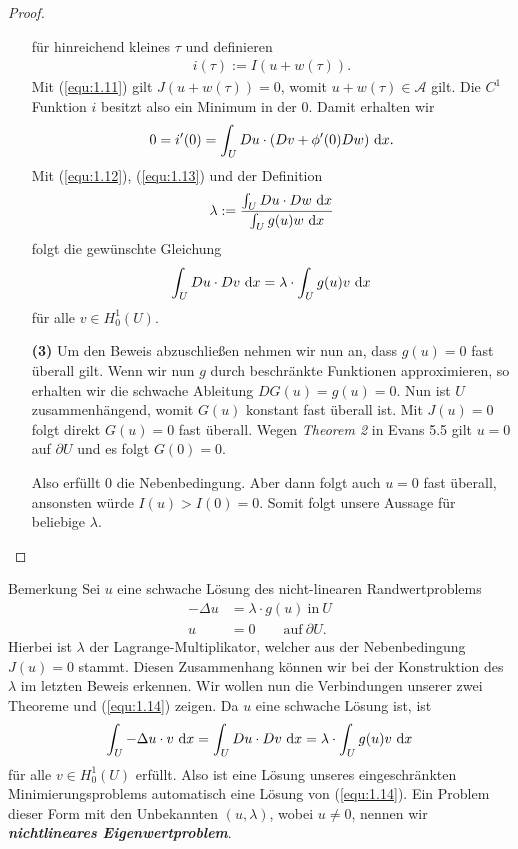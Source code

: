 \begin{proof}
\begin{enumerate}
für hinreichend kleines $\tau$ und definieren
\begin{align*}
i(\tau) := I ( u + w(\tau)).
\end{align*}
Mit (\ref{equ:1.11}) gilt $J(u + w(\tau)) = 0 $, womit $u + w(\tau) \in \mathcal{A}$ gilt.
Die $C^1$ Funktion $i$ besitzt also ein Minimum in der $0$.
Damit erhalten wir
\begin{equation}\label{equ:1.13}
0 = i^\prime(0) = \int_U Du \cdot (Dv + \phi^\prime(0)Dw) \td{x}.
\end{equation}
Mit (\ref{equ:1.12}), (\ref{equ:1.13}) und der Definition
\begin{align*}
\lambda := \frac{\int_U Du \cdot Dw \td{x}}{\int_U g(u)w \td{x}}
\end{align*}
folgt die gewünschte Gleichung
\begin{align*}
\int_U Du \cdot Dv \td{x} = \lambda \cdot \int_U g(u) v \td{x}
\end{align*}
für alle $v \in H_0^1(U)$.

\item[\textbf{(3)}]
Um den Beweis abzuschließen nehmen wir nun an, dass $g(u) = 0$ fast überall gilt.
Wenn wir nun $g$ durch beschränkte Funktionen approximieren, so erhalten wir die schwache Ableitung $DG(u) = g(u) = 0$.
Nun ist $U$ zusammenhängend, womit $G(u)$ konstant fast überall ist.
Mit $J(u) = 0 $ folgt direkt $G(u) = 0 $ fast überall.
Wegen \textit{Theorem 2} in Evans 5.5 gilt  $ u = 0 $ auf $\partial U $ und es folgt $G(0)= 0$.

Also erfüllt $0$ die Nebenbedingung.
Aber dann folgt auch $u = 0$ fast überall, ansonsten würde $I(u) > I(0) = 0$.
Somit folgt unsere Aussage für beliebige $\lambda$.
\end{enumerate}
\end{proof}

\begin{genericdf}{Bemerkung}\label{skript:1.4}
Sei $u$ eine schwache Lösung des nicht-linearen Randwertproblems
\begin{equation}\label{equ:1.14}
\begin{split}
-\Delta u & = \lambda \cdot g(u) \ \text{in} \ U \\
u & = 0 \quad \quad \text{auf} \ \partial U.
\end{split}
\end{equation}
Hierbei ist $\lambda$ der Lagrange-Multiplikator, welcher aus der Nebenbedingung $J(u) = 0$ stammt.
Diesen Zusammenhang können wir bei der Konstruktion des $\lambda$ im letzten Beweis erkennen.
Wir wollen nun die Verbindungen unserer zwei Theoreme und (\ref{equ:1.14}) zeigen.
Da $u$ eine schwache Lösung ist, ist 
\begin{equation*}
\int_U - \Delta u \cdot v  \ \text{\rmfamily d} x
= 
\int_U  Du \cdot Dv \ \text{\rmfamily d} x
=
\lambda \cdot \int_U g(u) v \ \text{\rmfamily d} x 
\end{equation*}
für alle $v \in H_0^1(U)$ erfüllt.
Also ist eine Lösung unseres eingeschränkten Minimierungsproblems automatisch eine Lösung von (\ref{equ:1.14}).
Ein Problem dieser Form mit den Unbekannten $(u,\lambda)$, wobei $u \neq 0 $, nennen
wir \textbf{\textit{nichtlineares Eigenwertproblem}}.  
\end{genericdf}